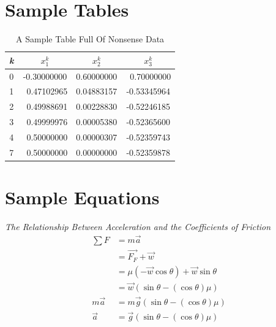 \documentclass[nobinding]{sydeStyle}	%
\begin{document}
\section{Sample Tables}
\begin{table}[h]
	\begin{tabular}{|c||ccc|}
		\hline
	\textbf{\em k}  &  $x_1^k$    &   $x_2^k$  & $x_3^k$ \\
		\hline \hline
	0   & -0.30000000 & 0.60000000 & ~0.70000000 \\
	1   & ~0.47102965 & 0.04883157 & -0.53345964 \\
	2   & ~0.49988691 & 0.00228830 & -0.52246185 \\
	3   & ~0.49999976 & 0.00005380 & -0.52365600 \\
	4   & ~0.50000000 & 0.00000307 & -0.52359743 \\
		\hline
	7   & ~0.50000000 & 0.00000000 & -0.52359878 \\
		\hline
	\end{tabular}
	\caption{A Sample Table Full Of Nonsense Data}
\end{table}

\section{Sample Equations}
\textit{The Relationship Between Acceleration and the Coefficients of Friction}
\begin{align*}
\sum F & = m\vec{a}\\
& = \vec{F_{F}}+\vec{w}\\
& = \mu(-\vec{w}\cos{\theta}) + \vec{w}\sin{\theta}\\
& = \vec{w}(\sin{\theta} - (\cos{\theta})\mu)\\
m\vec{a} & = m\vec{g}(\sin{\theta} - (\cos{\theta})\mu)\\
\vec{a} & = \vec{g}(\sin{\theta} - (\cos{\theta})\mu)\\
\end{align*}
\end{document}
